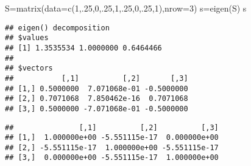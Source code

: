 \documentclass[
]{article}
\newenvironment{Shaded}{\begin{snugshade}}{\end{snugshade}}
\newcommand{\AttributeTok}[1]{\textcolor[rgb]{0.77,0.63,0.00}{#1}}
\newcommand{\DecValTok}[1]{\textcolor[rgb]{0.00,0.00,0.81}{#1}}
\newcommand{\FunctionTok}[1]{\textcolor[rgb]{0.00,0.00,0.00}{#1}}
\newcommand{\NormalTok}[1]{#1}
\newcommand{\OtherTok}[1]{\textcolor[rgb]{0.56,0.35,0.01}{#1}}
\newcommand{\SpecialCharTok}[1]{\textcolor[rgb]{0.00,0.00,0.00}{#1}}
\begin{document}
\begin{Shaded}
\begin{Highlighting}[]
\NormalTok{S}\OtherTok{=}\FunctionTok{matrix}\NormalTok{(}\AttributeTok{data=}\FunctionTok{c}\NormalTok{(}\DecValTok{1}\NormalTok{,.}\DecValTok{25}\NormalTok{,}\DecValTok{0}\NormalTok{,.}\DecValTok{25}\NormalTok{,}\DecValTok{1}\NormalTok{,.}\DecValTok{25}\NormalTok{,}\DecValTok{0}\NormalTok{,.}\DecValTok{25}\NormalTok{,}\DecValTok{1}\NormalTok{),}\AttributeTok{nrow=}\DecValTok{3}\NormalTok{)}
\NormalTok{s}\OtherTok{=}\FunctionTok{eigen}\NormalTok{(S)}
\NormalTok{s}
\end{Highlighting}
\end{Shaded}

\begin{verbatim}
## eigen() decomposition
## $values
## [1] 1.3535534 1.0000000 0.6464466
## 
## $vectors
##           [,1]          [,2]       [,3]
## [1,] 0.5000000  7.071068e-01 -0.5000000
## [2,] 0.7071068  7.850462e-16  0.7071068
## [3,] 0.5000000 -7.071068e-01 -0.5000000
\end{verbatim}

\begin{Shaded}
\end{Shaded}

\begin{verbatim}
##               [,1]          [,2]          [,3]
## [1,]  1.000000e+00 -5.551115e-17  0.000000e+00
## [2,] -5.551115e-17  1.000000e+00 -5.551115e-17
## [3,]  0.000000e+00 -5.551115e-17  1.000000e+00
\end{verbatim}
\end{document}
